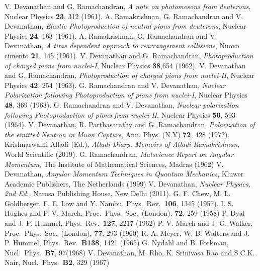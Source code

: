 \begin{thebibliography}{99}
 V. Devanathan and G. Ramachandran, \textit{A note on photomesons from deuterons}, Nuclear Physics \textbf{23}, 312 (1961).
 A. Ramakrishnan, G. Ramachandran and V. Devanathan, \textit{Elastic Photoproduction of neutral pions from deuterons}, Nuclear Physics \textbf{24}, 163 (1961).
 A. Ramakrishnan, G. Ramachandran and V. Devanathan, \textit{A time dependent approach to rearrangement collisions}, Nuovo cimento \textbf{21}, 145 (1961).
 V. Devanathan and G. Ramachandran, \textit{Photoproduction of charged pions from nuclei-I}, Nuclear Physics \textbf{38},654 (1962).
 V. Devanathan and G. Ramachandran, \textit{Photoproduction of charged pions from nuclei-II}, Nuclear Physics \textbf{42}, 254 (1963).
 G. Ramachandran and V. Devanathan, \textit{Nuclear Polarization following Photoproduction of pions from nuclei-I}, Nuclear Physics \textbf{48}, 369 (1963).
 G. Ramachandran and V. Devanathan, \textit{Nuclear polarization following Photoproduction of pions from nuclei-II}, Nuclear Physics \textbf{50}, 593 (1964).
 V. Devanathan, R. Parthasarathy and G. Ramachandran, \textit{Polarization of the emitted Neutron in Muon Capture}, Ann. Phys. (N.Y) \textbf{72}, 428 (1972).
 Krishnaswami Alladi (Ed.), \textit{Alladi Diary, Memoirs of Alladi Ramakrishnan}, World Scientific (2019).
 G. Ramachandran, \textit{Matscience Report on Angular Momentum}, The Institute of Mathematical Sciences, Madras (1962)
 V. Devanathan, \textit{Angular Momentum Techniques in Quantum Mechanics}, Kluwer Academic Publishers, The Netherlands (1999)
 V. Devanathan, \textit{Nuclear Physics, 2nd Ed.,} Narosa Publishing House, New Delhi (2011).
 G. F. Chew, M. L. Goldberger, F. E. Low and Y. Nambu, Phys.\ Rev.\ \textbf{106}, 1345 (1957).
 I. S. Hughes and P. V. March, Proc.\ Phys.\ Soc.\ (London), \textbf{72}, 259 (1958)
 P. Dyal and J. P. Hummel, Phys.\ Rev.\ \textbf{127}, 2217 (1962)
 P. V. March and J. G. Walker, Proc.\ Phys.\ Soc.\ (London), \textbf{77}, 293 (1960)
 R. A. Meyer, W. B. Walters and J. P. Hummel, Phys.\ Rev.\ \textbf{B138}, 1421 (1965)
 G. Nydahl and B. Forkman, Nucl.\ Phys.\ \textbf{B7}, 97(1968)
 V. Devanathan, M. Rho, K. Srinivasa Rao and S.C.K. Nair, Nucl.\ Phys.\ \textbf{B2}, 329 (1967)

\end{thebibliography}
